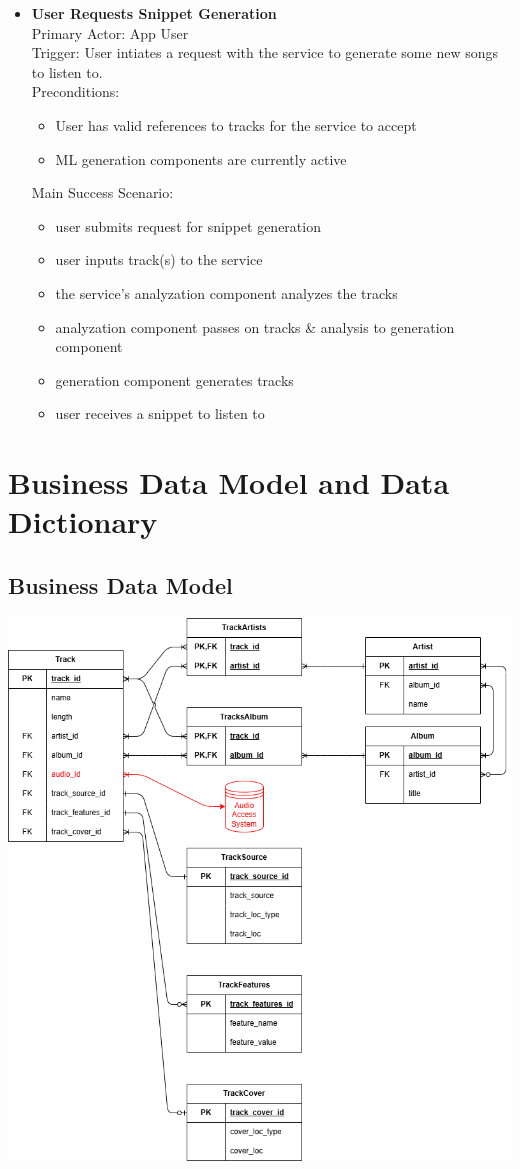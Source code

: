 \documentclass[12pt]{article}
\begin{document}
\begin{itemize}
  \item \textbf{User Requests Snippet Generation}
    \\Primary Actor: App User
    \\Trigger: User intiates a request with the service to generate some new songs to listen to. 
    \\Preconditions: 
    \begin{itemize}
    \item User has valid references to tracks for the service to accept
    \item ML generation components are currently active
    \end{itemize}

    Main Success Scenario: 
    \begin{itemize}
    \item user submits request for snippet generation
    \item user inputs track(s) to the service
    \item the service's analyzation component analyzes the tracks
    \item analyzation component passes on tracks \& analysis to generation component
    \item generation component generates tracks
    \item user receives a snippet to listen to
    \end{itemize}
\end{itemize}



\section{Business Data Model and Data Dictionary}
\subsection{Business Data Model}
\includegraphics[width=\textwidth]{7_1_business_data_model.png}
\end{document}
